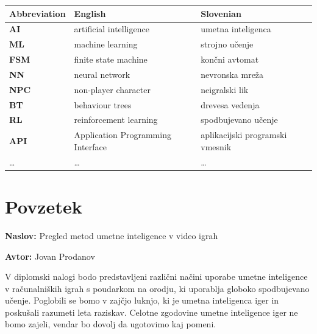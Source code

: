 \documentclass[a4paper,12pt,openright]{book}
\newcommand{\ttitle}{Pregled metod umetne inteligence v video igrah}
\newcommand{\tauthor}{Jovan Prodanov}
\newcommand{\clearemptydoublepage}{\newpage{\pagestyle{empty}\cleardoublepage}}
\begin{document}
\noindent\begin{tabular}{p{}|p{}|p{}}    %
  {\bf Abbreviation} & {\bf English} & {\bf Slovenian} \\ \hline
  {\bf AI}      & artificial intelligence           & umetna inteligenca \\
  {\bf ML}      & machine learning                  & strojno učenje \\
  {\bf FSM}     & finite state machine              & končni avtomat \\
  {\bf NN}      & neural network                    & nevronska mreža \\
  {\bf NPC}     & non-player character              & neigralski lik \\
  {\bf BT }     & behaviour trees                   & drevesa vedenja \\
  {\bf RL }     & reinforcement learning            & spodbujevano učenje \\
  {\bf API }    & Application Programming Interface & aplikacijski programski vmesnik \\
  \dots         & \dots                             & \dots \\
\end{tabular}

\clearemptydoublepage


\chapter*{Povzetek}

\noindent\textbf{Naslov:} \ttitle
\bigskip

\noindent\textbf{Avtor:} \tauthor
\bigskip

\noindent 
V diplomski nalogi bodo predstavljeni različni načini uporabe umetne inteligence v računalniških igrah s poudarkom na orodju, ki uporablja globoko spodbujevano učenje. Poglobili se bomo v zajčjo luknjo, ki je umetna inteligenca iger in poskušali razumeti leta raziskav. Celotne zgodovine umetne inteligence iger ne bomo zajeli, vendar bo dovolj da ugotovimo kaj pomeni.
\bigskip
\end{document}
